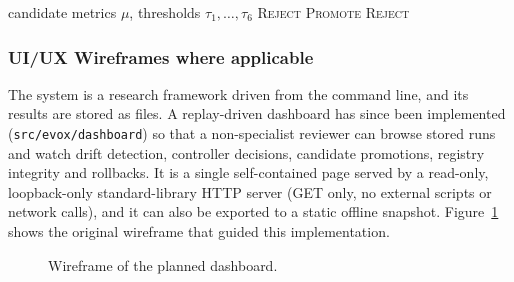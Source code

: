 \documentclass{article}
\begin{document}
\begin{algorithm}[h]
\caption{Safety gate (fail-closed)}
\label{alg:gate}
\small
\begin{algorithmic}[1]
\Require candidate metrics $\mu$, thresholds $\tau_1,\dots,\tau_6$
 \State \Return \textsc{Reject}
\EndIf
{}
  \State \Return \textsc{Promote}
\Else \State \Return \textsc{Reject} \EndIf
\end{algorithmic}
\end{algorithm}

	\subsubsection{UI/UX Wireframes where applicable}

The system is a research framework driven from the command line, and its results are stored as files. A replay-driven dashboard has since been implemented (\texttt{src/evox/dashboard}) so that a non-specialist reviewer can browse stored runs and watch drift detection, controller decisions, candidate promotions, registry integrity and rollbacks. It is a single self-contained page served by a read-only, loopback-only standard-library HTTP server (GET only, no external scripts or network calls), and it can also be exported to a static offline snapshot. Figure~\ref{fig:wireframe} shows the original wireframe that guided this implementation.

\begin{figure}[h]
\centering
{}
\caption{Wireframe of the planned dashboard.}
\label{fig:wireframe}
\end{figure}
\end{document}
